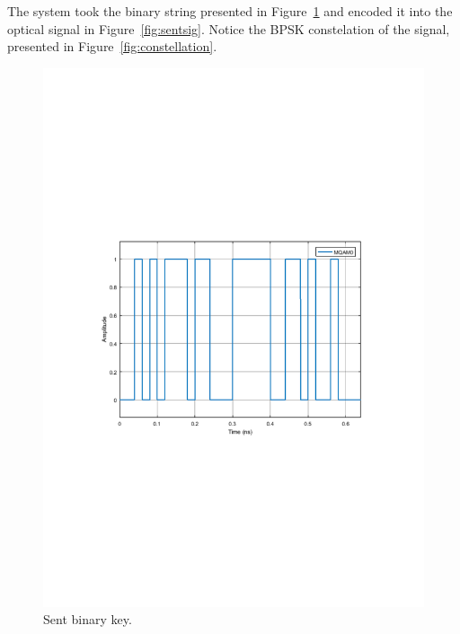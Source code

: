 \documentclass[a4paper]{article}
\begin{document}
The system took the binary string presented in Figure~\ref{fig:sentkey} and encoded it into the optical signal in Figure~\ref{fig:sentsig}. Notice the BPSK constelation of the signal, presented in Figure~\ref{fig:constellation}.
\begin{figure}[H]
\centering
\includegraphics[width=\linewidth, trim= 0mm 95mm 0mm 95mm, clip]{binarystring.pdf}
\caption{Sent binary key.}
\label{fig:sentkey}
\end{figure}
\end{document}
